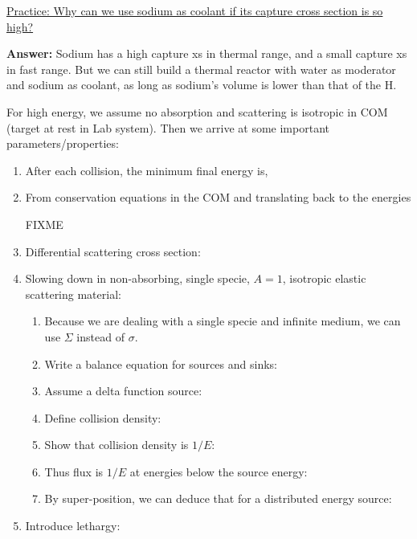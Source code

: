 \documentclass{school-22.211-notes}
\begin{document}
\uline{Practice: Why can we use sodium as coolant if its capture cross section is so high?}  

\textbf{Answer:} Sodium has a high capture xs in thermal range, and a small capture xs in fast range. But we can still build a thermal reactor with water as moderator and sodium as coolant, as long as sodium's volume is lower than that of the H. 


\clearpage
For high energy, we assume no absorption and scattering is isotropic in COM (target at rest in Lab system). Then we arrive at some important parameters/properties: 
\begin{enumerate}
\item After each collision, the minimum final energy is,

\item From conservation equations in the COM and translating back to the energies 

FIXME

\item Differential scattering cross section: 


\item Slowing down in non-absorbing, single specie, $A=1$, isotropic elastic scattering material: 
  \begin{enumerate}
    \item Because we are dealing with a single specie and infinite medium, we can use $\Sigma$ instead of $\sigma$.
    \item Write a balance equation for sources and sinks: 
    \item Assume a delta function source: 
    \item Define collision density:
    \item Show that collision density is $1/E$: 
    \item Thus flux is $1/E$ at energies below the source energy: 
    \item By super-position, we can deduce that for a distributed energy source: 
  \end{enumerate}


\item Introduce lethargy: 



\end{enumerate}
\end{document}
